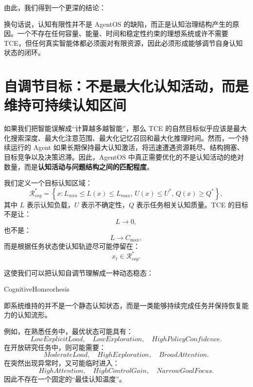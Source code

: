 由此，我们得到一个更深的结论：
\begin{statementbox}
\centering
{}
\end{statementbox}
换句话说，认知有限性并不是 AgentOS 的缺陷，而正是认知治理结构产生的原因。一个不存在任何容量、能量、时间和稳定性约束的理想系统或许不需要 TCE，但任何真实智能体都必须面对有限资源，因此必须形成能够调节自身认知状态的闭环。

\section{自调节目标：不是最大化认知活动，而是维持可持续认知区间}

如果我们把智能误解成``计算越多越智能''，那么 TCE 的自然目标似乎应该是最大化搜索深度、最大化注意范围、最大化记忆召回和最大化推理时间。然而，一个持续运行的 Agent 如果长期保持最大认知激活，将迅速遭遇资源耗尽、结构拥塞、目标竞争以及决策迟滞。因此，AgentOS 中真正需要优化的不是认知活动的绝对数量，而是\textbf{认知活动与问题结构之间的匹配程度}。

我们定义一个目标认知区域：
\begin{equation}
\mathcal R_{cog}^{*}
=
\left\{
x:
L_{min}\le L(x)\le L_{max},
\,
U(x)\le U^{*},
\,
Q(x)\ge Q^{*}
\right\},
\end{equation}
其中 $L$ 表示认知负载，$U$ 表示不确定性，$Q$ 表示任务相关认知质量。TCE 的目标不是让：
\begin{equation}
L\rightarrow 0,
\end{equation}
也不是：
\begin{equation}
L\rightarrow C_{\max},
\end{equation}
而是根据任务状态使认知轨迹尽可能停留在：
\begin{equation}
x_t\in\mathcal R_{cog}^{*}.
\end{equation}

这使我们可以把认知自调节理解成一种动态稳态：
\begin{statementbox}
CognitiveHomeorhesis
\end{statementbox}
即系统维持的并不是一个静态认知状态，而是一类能够持续完成任务并保持恢复能力的认知流形。

例如，在熟悉任务中，最优状态可能具有：
\begin{equation}
LowExplicitLoad,
\quad
LowExploration,
\quad
HighPolicyConfidence.
\end{equation}
在开放研究任务中，则可能需要：
\begin{equation}
ModerateLoad,
\quad
HighExploration,
\quad
BroadAttention.
\end{equation}
在突然出现异常时，又可能临时进入：
\begin{equation}
HighAttention,
\quad
HighControlGain,
\quad
NarrowGoalFocus.
\end{equation}
因此不存在一个固定的``最佳认知温度''。

